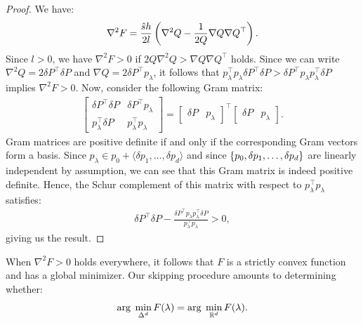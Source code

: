\documentclass{article}
\begin{document}
\begin{proof}
  We have:
  \begin{align*}
    \nabla^2 F = \frac{\hat{s}h}{2l} \left(\nabla^2 Q - \frac{1}{2 Q} \nabla Q \nabla Q^\top\right).
  \end{align*}
  Since $l > 0$, we have $\nabla^2 F > 0$ if
  $2 Q \nabla^2 Q > \nabla Q \nabla Q^\top$ holds. Since we can write
  $\nabla^2 Q = 2 \delta P^\top \delta P$ and
  $\nabla Q = 2 \delta P^\top p_\lambda$, it follows that
  $p_\lambda^\top p_\lambda \delta P^\top \delta P > \delta P^\top
  p_\lambda p_\lambda^\top \delta P$ implies $\nabla^2 F > 0$. Now,
  consider the following Gram matrix:
  \begin{align*}
    \begin{bmatrix}
      \delta P^\top \delta P & \delta P^\top p_\lambda \\
      p_\lambda^\top \delta P & p_\lambda^\top p_\lambda
    \end{bmatrix} = \begin{bmatrix}
      \delta P & p_\lambda
    \end{bmatrix}^\top \begin{bmatrix}
      \delta P & p_\lambda
    \end{bmatrix}.
  \end{align*}
  Gram matrices are positive definite if and only if the corresponding
  Gram vectors form a basis. Since
  $p_\lambda \in p_0 + \langle \delta p_1, \hdots, \delta p_d \rangle$
  and since $\left\{p_0, \delta p_1, \hdots, \delta p_d\right\}$ are linearly
  independent by assumption, we can see that this Gram matrix is
  indeed positive definite. Hence, the Schur complement of this matrix
  with respect to $p_\lambda^\top p_\lambda$ satisfies:
  \begin{align*}
    \delta P^\top \delta P - \frac{\delta P^\top p_\lambda p_\lambda^\top \delta P}{p_\lambda^\top p_\lambda} > 0,
  \end{align*}
  giving us the result.
\end{proof}

\begin{remark}
  When $\nabla^2 F > 0$ holds everywhere, it follows that $F$ is a
  strictly convex function and has a global minimizer. Our skipping
  procedure amounts to determining whether:
  \begin{align}\label{eq:minimizers-are-the-same}
    \operatorname{arg}\;\min_{\Delta^d} F(\lambda) = \operatorname{arg}\;\min_{\mathbb{R}^d} F(\lambda).
  \end{align}
\end{remark}
\end{document}
